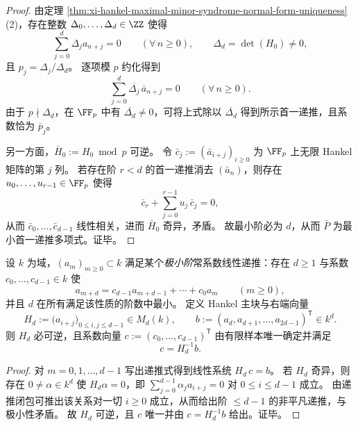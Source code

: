 \begin{proof}
由定理 \ref{thm:xi-hankel-maximal-minor-syndrome-normal-form-uniqueness}(2)，存在整数 \(\Delta_0,\dots,\Delta_d\in\ZZ\) 使得
\[
\sum_{j=0}^{d}\Delta_j a_{n+j}=0\qquad(\forall\,n\ge 0),
\qquad
\Delta_d=\det(H_0)\neq 0,
\]
且 \(p_j=\Delta_j/\Delta_d\)。
逐项模 \(p\) 约化得到
\[
\sum_{j=0}^{d}\overline{\Delta_j}\,\bar a_{n+j}=0\qquad(\forall\,n\ge 0).
\]
由于 \(p\nmid \Delta_d\)，在 \(\FF_p\) 中有 \(\overline{\Delta_d}\neq 0\)，可将上式除以 \(\overline{\Delta_d}\) 得到所示首一递推，且系数恰为 \(\bar p_j\)。
\par
另一方面，\(\bar H_0:=H_0\bmod p\) 可逆。
令 \(\bar c_j:=(\bar a_{i+j})_{i\ge 0}\) 为 \(\FF_p\) 上无限 Hankel 矩阵的第 \(j\) 列。
若存在阶 \(r<d\) 的首一递推消去 \((\bar a_n)\)，则存在 \(u_0,\dots,u_{r-1}\in\FF_p\) 使得
\[
\bar c_r+\sum_{j=0}^{r-1}u_j\,\bar c_j=0,
\]
从而 \(\bar c_0,\dots,\bar c_{d-1}\) 线性相关，进而 \(\bar H_0\) 奇异，矛盾。
故最小阶必为 \(d\)，从而 \(\bar P\) 为最小首一递推多项式。证毕。
\end{proof}

\begin{corollary}\label{cor:xi-hankel-minimal-recurrence-inversion-formula}
设 \(k\) 为域，\((a_m)_{m\ge 0}\subset k\) 满足某个\emph{极小阶}常系数线性递推：存在 \(d\ge 1\) 与系数 \(c_0,\dots,c_{d-1}\in k\) 使
\[
a_{m+d}=c_{d-1}a_{m+d-1}+\cdots+c_0a_m\qquad(m\ge 0),
\]
并且 \(d\) 在所有满足该性质的阶数中最小。
定义 Hankel 主块与右端向量
\[
H_d:=\bigl(a_{i+j}\bigr)_{0\le i,j\le d-1}\in M_d(k),
\qquad
b:=(a_d,a_{d+1},\dots,a_{2d-1})^{\mathsf T}\in k^d.
\]
则 \(H_d\) 必可逆，且系数向量 \(c:=(c_0,\dots,c_{d-1})^{\mathsf T}\) 由有限样本唯一确定并满足
\[
\boxed{\;c=H_d^{-1}b.\;}
\]
\end{corollary}
\begin{proof}
对 \(m=0,1,\dots,d-1\) 写出递推式得到线性系统
\(
H_d\,c=b
\)。
若 \(H_d\) 奇异，则存在 \(0\neq \alpha\in k^d\) 使 \(H_d\alpha=0\)，即
\(
\sum_{j=0}^{d-1}\alpha_j a_{i+j}=0
\)
对 \(0\le i\le d-1\) 成立。
由递推闭包可推出该关系对一切 \(i\ge 0\) 成立，从而给出阶 \(\le d-1\) 的非平凡递推，与极小性矛盾。
故 \(H_d\) 可逆，且 \(c\) 唯一并由 \(c=H_d^{-1}b\) 给出。证毕。
\end{proof}

